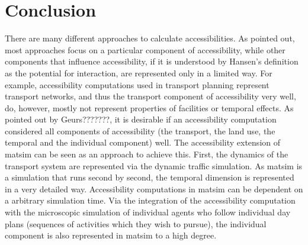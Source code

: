 %
%


\section{Conclusion}
There are many different approaches to calculate accessibilities. As pointed out, most approaches focus on a particular 
component of accessibility, while other components that influence accessibility, if it is understood by Hansen's definition 
as the potential for interaction, are represented only in a limited way. For example, accessibility computations used in 
transport planning represent transport networks, and thus the transport component of accessibility very well, do, however, 
mostly not represent properties of facilities or temporal effects. As pointed out by Geurs???????, it is desirable if an 
accessibility computation considered all components of accessibility (the transport, the land use, the temporal and the 
individual component) well. The accessibility extension of \gls{matsim} can be seen as an approach to achieve this. First, 
the dynamics of the transport system are represented via the dynamic traffic simulation. As \gls{matsim} is a simulation 
that runs second by second, the temporal dimension is represented in a very detailed way. Accessibility computations in 
\gls{matsim} can be dependent on a arbitrary simulation time. Via the integration of the accessibility computation with 
the microscopic simulation of individual agents who follow individual day plans (sequences of activities which they 
wish to pursue), the individual component is also represented in \gls{matsim} to a high degree.

